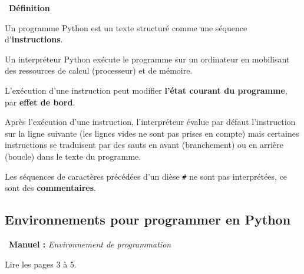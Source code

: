 \documentclass[a4paper, french, 12pt]{article}  %
\newcounter{def}
\newenvironment{definition}[1]
{\par \medskip   \addtocounter{def}{1} \noindent  
\begin{bclogo}[arrondi =0.1,  ombre = true, barre=none, logo=\bcbook, marge=4]{~\textbf{Définition} \textbf{\thedef} {\itshape #1} }  \par}
{
\end{bclogo}
 \par \bigskip }
\newcounter{prog}
\newenvironment{manuel}[1]
{\par \medskip  \noindent  
\begin{bclogo}[arrondi =0.1,   noborder = true, logo=\bcoeil, marge=4]{~\textbf{Manuel :}  {\itshape #1} }  \itshape \par}
{
\end{bclogo}
 \par \bigskip }
\begin{document}
\begin{definition}{}

Un programme Python est un texte structuré comme une séquence d'\textbf{instructions}. 

Un interpréteur Python  exécute  le  programme sur un ordinateur en  mobilisant  des ressources de calcul (processeur) et de mémoire. 

L'exécution d'une instruction peut modifier \textbf{l'état courant du programme}, par \textbf{effet de bord}.   

Après l'exécution d'une instruction, l'interpréteur évalue par défaut l'instruction sur la ligne suivante (les lignes vides ne sont pas prises en compte) mais certaines instructions se traduisent par des sauts en avant (branchement) ou en arrière (boucle) dans le texte du programme.

Les séquences de caractères précédées d'un dièse \verb+#+ ne sont pas interprétées, ce sont des \textbf{commentaires}.



\end{definition}

\subsection{Environnements pour programmer en  Python}

\begin{manuel}{Environnement de programmation}
Lire les pages 3 à 5.
\end{manuel}
\end{document}
